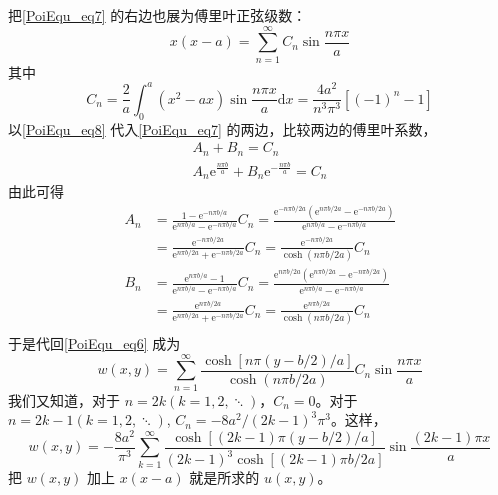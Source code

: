 \begin{example}{}
\begin{equation}
    \end{equation}
    把\autoref{PoiEqu_eq7} 的右边也展为傅里叶正弦级数：
    \begin{equation} \label{PoiEqu_eq8}
        x(x-a)=\sum_{n=1}^{\infty} C_{n} \sin \frac{n \pi x}{a}
    \end{equation}
    其中
    \begin{equation}
        C_{n}=\frac{2}{a} \int_{0}^{a}\left(x^{2}-a x\right) \sin \frac{n \pi x}{a} \mathrm{d} x=\frac{4 a^{2}}{n^{3} \pi^{3}}\left[(-1)^{n}-1\right]
    \end{equation}
    以\autoref{PoiEqu_eq8} 代入\autoref{PoiEqu_eq7} 的两边，比较两边的傅里叶系数，
    \begin{equation}
        \begin{array}{c}A_{n}+B_{n}=C_{n} \\ A_{n} \mathrm{e}^{\frac{n \pi b}{a}}+B_{n} \mathrm{e}^{-\frac{n \pi b}{a}}=C_{n}\end{array}
    \end{equation}
    由此可得
    \begin{equation}
        \begin{aligned}
            A_n&=\frac{1-\text{e}^{-n\pi b/a}}{\text{e}^{n\pi b/a}-\text{e}^{-n\pi b/a}}C_n=\frac{\text{e}^{-n\pi b/2a}\left( \text{e}^{n\pi b/2a}-\text{e}^{-n\pi b/2a} \right)}{\text{e}^{n\pi b/a}-\text{e}^{-n\pi b/a}}\\
            &=\frac{\text{e}^{-n\pi b/2a}}{\text{e}^{n\pi b/2a}+\text{e}^{-n\pi b/2a}}C_n=\frac{\text{e}^{-n\pi b/2a}}{\cosh \left( n\pi b/2a \right)}C_n\\
            B_n&=\frac{\text{e}^{n\pi b/a}-1}{\text{e}^{n\pi b/a}-\text{e}^{-n\pi b/a}}C_n=\frac{\text{e}^{n\pi b/2a}\left( \text{e}^{n\pi b/2a}-\text{e}^{-n\pi b/2a} \right)}{\text{e}^{n\pi b/a}-\text{e}^{-n\pi b/a}}\\
            &=\frac{\text{e}^{n\pi b/2a}}{\text{e}^{n\pi b/2a}+\text{e}^{-n\pi b/2a}}C_n=\frac{\text{e}^{n\pi b/2a}}{\cosh \left( n\pi b/2a \right)}C_n\\
        \end{aligned}
    \end{equation}
    于是代回\autoref{PoiEqu_eq6} 成为
    \begin{equation}
        w(x, y)=\sum_{n=1}^{\infty} \frac{\cosh [n \pi(y-b / 2) / a]}{\cosh (n \pi b / 2 a)} C_{n} \sin \frac{n \pi x}{a}
    \end{equation}
    我们又知道，对于 $n=2k(k=1,2,\ddots)$，$C_n=0$。对于 $n=2k-1(k=1,2,\ddots)$, $C_n=-8a^2/(2k-1)^3\pi^3$。这样，
    \begin{equation}
        w(x, y)=-\frac{8 a^{2}}{\pi^{3}} \sum_{k=1}^{\infty} \frac{\cosh [(2 k-1) \pi(y-b / 2) / a]}{(2 k-1)^{3} \cosh [(2 k-1) \pi b / 2 a]} \sin \frac{(2 k-1) \pi x}{a}
    \end{equation}
    把 $w(x,y)$ 加上 $x(x-a)$ 就是所求的 $u(x,y)$。
\end{example}
